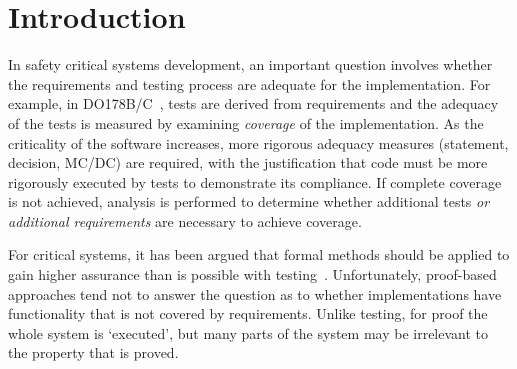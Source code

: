 \section{Introduction}
\label{sec:intro}
%

In safety critical systems development, an important question involves whether the requirements and testing process are adequate for the implementation.  For example, in DO178B/C~\cite{DO178C}, tests are derived from requirements and the adequacy of the tests is measured by examining {\em coverage} of the implementation.  As the criticality of the software increases, more rigorous adequacy measures (statement, decision, MC/DC) are required, with the justification that code must be more rigorously executed by tests to demonstrate its compliance.  If complete coverage is not achieved, analysis is performed to determine whether additional tests {\em or additional requirements} are necessary to achieve coverage.

For critical systems, it has been argued that formal methods should be applied to gain higher assurance than is possible with testing~\cite{Miller10:CACM,Rushby09:SEFM,Hardin09:Security}. Unfortunately, proof-based approaches tend not to answer the question as to whether implementations have functionality that is not covered by requirements.  Unlike testing, for proof the whole system is `executed', but many parts of the system may be irrelevant to the property that is proved.


